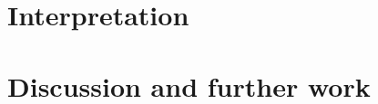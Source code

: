 \documentclass[
fontsize=11pt,
twoside
]{scrreprt}
\begin{document}
\chapter{Interpretation}\label{ch:interpretation}







\chapter{Discussion and further work}










\cleardoublepage


\end{document}
